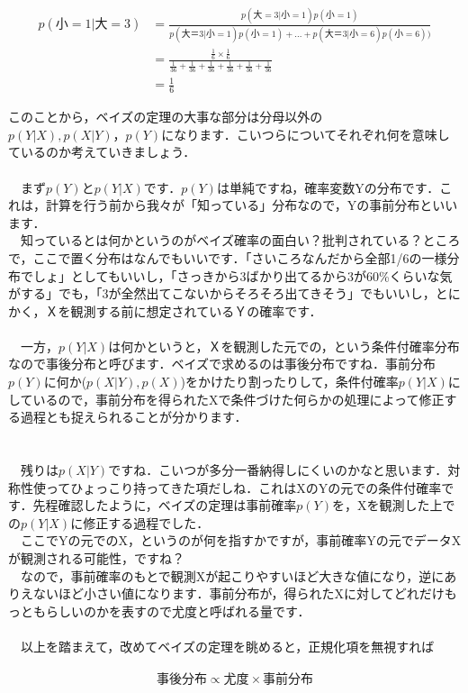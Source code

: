 \documentclass[11pt,a4paper]{ujreport} 	%
\begin{document}
\begin{align}
p(小=1|大=3) &= \frac{p(大=3|小=1)p(小=1)}{p(大＝3|小=1)p(小=1) + ... + p(大＝3|小=6)p(小=6))}\\
&= \frac{\frac{1}{6} \times \frac{1}{6}}{\frac{1}{36} + \frac{1}{36} + \frac{1}{36} + \frac{1}{36} + \frac{1}{36}+ \frac{1}{36}}\\
&= \frac{1}{6}
\end{align}

このことから，ベイズの定理の大事な部分は分母以外の$p(Y|X), p(X|Y)，p(Y)$になります．こいつらについてそれぞれ何を意味しているのか考えていきましょう．\\
\\
　まず$p(Y)$と$p(Y|X)$です．$p(Y)$は単純ですね，確率変数Yの分布です．これは，計算を行う前から我々が「知っている」分布なので，Yの事前分布といいます．\\
　知っているとは何かというのがベイズ確率の面白い？批判されている？ところで，ここで置く分布はなんでもいいです．「さいころなんだから全部1/6の一様分布でしょ」としてもいいし，「さっきから3ばかり出てるから3が60\%くらいな気がする」でも，「3が全然出てこないからそろそろ出てきそう」でもいいし，とにかく，Ｘを観測する前に想定されているＹの確率です．\\
\\
　一方，$p(Y|X)$は何かというと，Ｘを観測した元での，という条件付確率分布なので事後分布と呼びます．ベイズで求めるのは事後分布ですね．事前分布$p(Y)$に何か($p(X|Y), p(X)$)をかけたり割ったりして，条件付確率$p(Y|X)$にしているので，事前分布を得られたXで条件づけた何らかの処理によって修正する過程とも捉えられることが分かります．\\
\\
\\
　残りは$p(X|Y)$ですね．こいつが多分一番納得しにくいのかなと思います．対称性使ってひょっこり持ってきた項だしね．これはXのYの元での条件付確率です．先程確認したように，ベイズの定理は事前確率$p(Y)$を，Xを観測した上での$p(Y|X)$に修正する過程でした．\\
　ここでYの元でのX，というのが何を指すかですが，事前確率Yの元でデータXが観測される可能性，ですね？
\\
　なので，事前確率のもとで観測Xが起こりやすいほど大きな値になり，逆にありえないほど小さい値になります．事前分布が，得られたXに対してどれだけもっともらしいのかを表すので尤度と呼ばれる量です．\\
\\
　以上を踏まえて，改めてベイズの定理を眺めると，正規化項を無視すれば

\begin{align}
事後分布 \propto 尤度 \times 事前分布
\end{align}
\end{document}
